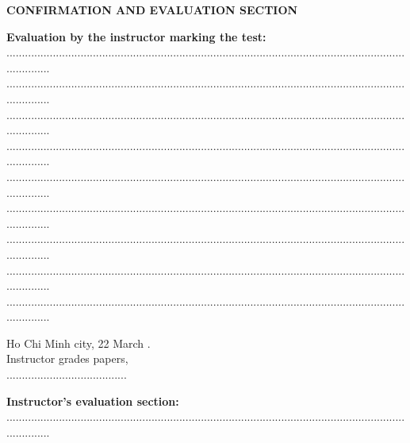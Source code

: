 \newpage
\begin{center}
	\Large{\textbf{CONFIRMATION AND EVALUATION SECTION}}
\end{center}
	\textbf{Evaluation by the instructor marking the test:}\\
	...............................................................................................................................................\\
	...............................................................................................................................................\\
	...............................................................................................................................................\\
	...............................................................................................................................................\\
	...............................................................................................................................................\\
	...............................................................................................................................................\\
	...............................................................................................................................................\\
	...............................................................................................................................................\\
	...............................................................................................................................................
\begin{center}
	\hspace*{5cm} Ho Chi Minh city, 22 March \nam.\\
	\hspace*{5cm} Instructor grades papers,\\
	\vspace*{1.2cm}
	\hspace*{5cm} .......................................
\end{center}
	\vspace*{0.5cm}
	\textbf{Instructor's evaluation section:}\\
	...............................................................................................................................................\\
